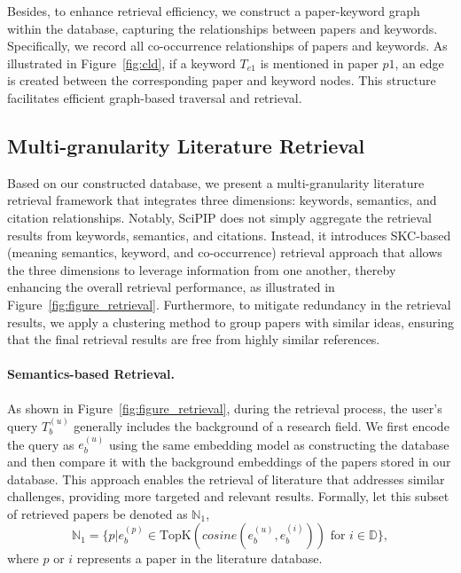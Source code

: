 \documentclass{article}
\theoremstyle{plain}
\theoremstyle{definition}
\theoremstyle{remark}
\begin{document}
Besides, to enhance retrieval efficiency, we construct a paper-keyword graph within the database, capturing the relationships between papers and keywords. Specifically, we record all co-occurrence relationships of papers and keywords. As illustrated in Figure~\ref{fig:cld}, if a keyword $T_{e1}$ is mentioned in paper $p1$, an edge is created between the corresponding paper and keyword nodes. This structure facilitates efficient graph-based traversal and retrieval.

\subsection{Multi-granularity Literature Retrieval}  \label{sec:liter-retrive}

Based on our constructed database, we present a multi-granularity literature retrieval framework that integrates three dimensions: keywords, semantics, and citation relationships. Notably, SciPIP does not simply aggregate the retrieval results from keywords, semantics, and citations. Instead, it introduces SKC-based (meaning semantics, keyword, and co-occurrence) retrieval approach that allows the three dimensions to leverage information from one another, thereby enhancing the overall retrieval performance, as illustrated in Figure~\ref{fig:figure_retrieval}.
Furthermore, to mitigate redundancy in the retrieval results, we apply a clustering method to group papers with similar ideas, ensuring that the final retrieval results are free from highly similar references.

\paragraph{Semantics-based Retrieval.} 
As shown in Figure~\ref{fig:figure_retrieval}, during the retrieval process, the user's query $T_b^{(u)}$ generally includes the background of a research field. We first encode the query as $e_b^{(u)}$ using the same embedding model as constructing the database and then compare it with the background embeddings of the papers stored in our database. This approach enables the retrieval of literature that addresses similar challenges, providing more targeted and relevant results.
Formally, let this subset of retrieved papers be denoted as $\mathbb{N}_1$,
\begin{equation}
\label{equ:n1}
    \mathbb{N}_1 = \{p | e_b^{(p)} \in \text{TopK}(cosine(e_b^{(u)}, e_b^{(i)})) \text{ for } i \in \mathbb{D} \},
\end{equation}
where $p$ or $i$ represents a paper in the literature database.
\end{document}
